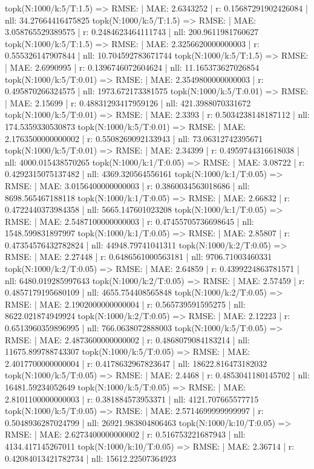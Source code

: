 topk(N:1000/k:5/T:1.5) => RMSE: | MAE: 2.6343252 | r: 0.15687291902426084 | nll: 34.27664416475825
topk(N:1000/k:5/T:1.5) => RMSE: | MAE: 3.058765529389575 | r: 0.2484623464111743 | nll: 200.9611981760627
topk(N:1000/k:5/T:1.5) => RMSE: | MAE: 2.3256620000000003 | r: 0.555326147907844 | nll: 10.704592783671744
topk(N:1000/k:5/T:1.5) => RMSE: | MAE: 2.6990995 | r: 0.1396746072604624 | nll: 11.165373627026854
topk(N:1000/k:5/T:0.01) => RMSE: | MAE: 2.3549800000000003 | r: 0.495870266324575 | nll: 1973.672173381575
topk(N:1000/k:5/T:0.01) => RMSE: | MAE: 2.15699 | r: 0.48831293417959126 | nll: 421.3988070331672
topk(N:1000/k:5/T:0.01) => RMSE: | MAE: 2.3393 | r: 0.5034238148187112 | nll: 174.5359330530873
topk(N:1000/k:5/T:0.01) => RMSE: | MAE: 2.1763500000000002 | r: 0.5508269092133943 | nll: 73.06312742395671
topk(N:1000/k:5/T:0.01) => RMSE: | MAE: 2.34399 | r: 0.4959744316618038 | nll: 4000.015438570265
topk(N:1000/k:1/T:0.05) => RMSE: | MAE: 3.08722 | r: 0.4292315075137482 | nll: 4369.320564556161
topk(N:1000/k:1/T:0.05) => RMSE: | MAE: 3.0156400000000003 | r: 0.3860034563018686 | nll: 8698.565467188118
topk(N:1000/k:1/T:0.05) => RMSE: | MAE: 2.66832 | r: 0.4722440373984358 | nll: 5665.147601023208
topk(N:1000/k:1/T:0.05) => RMSE: | MAE: 2.5487100000000003 | r: 0.47455705736698645 | nll: 1548.599831897997
topk(N:1000/k:1/T:0.05) => RMSE: | MAE: 2.85807 | r: 0.47354576432782824 | nll: 44948.79741041311
topk(N:1000/k:2/T:0.05) => RMSE: | MAE: 2.27448 | r: 0.6486561000563181 | nll: 9706.71003460331
topk(N:1000/k:2/T:0.05) => RMSE: | MAE: 2.64859 | r: 0.4399224863781571 | nll: 6480.019285997643
topk(N:1000/k:2/T:0.05) => RMSE: | MAE: 2.57459 | r: 0.4857179195680109 | nll: 4655.754408565848
topk(N:1000/k:2/T:0.05) => RMSE: | MAE: 2.1902000000000004 | r: 0.565739591595275 | nll: 8622.021874949924
topk(N:1000/k:2/T:0.05) => RMSE: | MAE: 2.12223 | r: 0.6513960359896995 | nll: 766.0638072888003
topk(N:1000/k:5/T:0.05) => RMSE: | MAE: 2.4873600000000002 | r: 0.4868079084183214 | nll: 11675.899788743307
topk(N:1000/k:5/T:0.05) => RMSE: | MAE: 2.4017700000000004 | r: 0.4178632967823647 | nll: 18622.816473182032
topk(N:1000/k:5/T:0.05) => RMSE: | MAE: 2.4468 | r: 0.4853041180145702 | nll: 16481.59234052649
topk(N:1000/k:5/T:0.05) => RMSE: | MAE: 2.8101100000000003 | r: 0.381884573953371 | nll: 4121.707665577715
topk(N:1000/k:5/T:0.05) => RMSE: | MAE: 2.5714699999999997 | r: 0.5048936287024799 | nll: 26921.983804806463
topk(N:1000/k:10/T:0.05) => RMSE: | MAE: 2.6273400000000002 | r: 0.516753221687943 | nll: 4134.417145267011
topk(N:1000/k:10/T:0.05) => RMSE: | MAE: 2.36714 | r: 0.42084013421782734 | nll: 15612.22507364923

